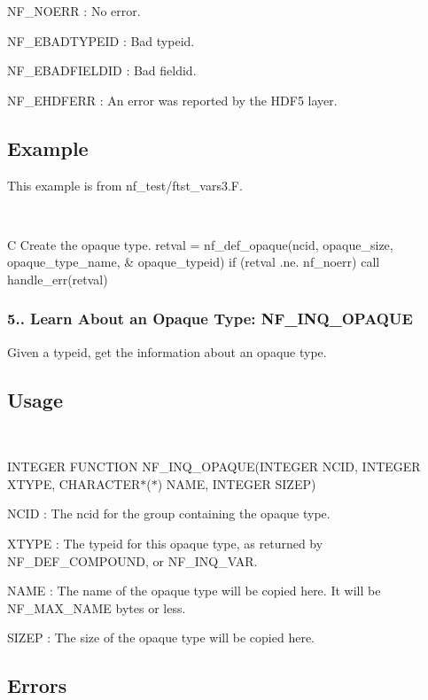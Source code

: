 {\ttfamily N\+F\+\_\+\+N\+O\+E\+RR} \+: No error.

{\ttfamily N\+F\+\_\+\+E\+B\+A\+D\+T\+Y\+P\+E\+ID} \+: Bad typeid.

{\ttfamily N\+F\+\_\+\+E\+B\+A\+D\+F\+I\+E\+L\+D\+ID} \+: Bad fieldid.

{\ttfamily N\+F\+\_\+\+E\+H\+D\+F\+E\+RR} \+: An error was reported by the H\+D\+F5 layer.

\subsection*{Example }

This example is from nf\+\_\+test/ftst\+\_\+vars3.\+F.

 

C Create the opaque type. retval = nf\+\_\+def\+\_\+opaque(ncid, opaque\+\_\+size, opaque\+\_\+type\+\_\+name, \& opaque\+\_\+typeid) if (retval .ne. nf\+\_\+noerr) call handle\+\_\+err(retval)

\subsubsection*{5.. Learn About an Opaque Type\+: N\+F\+\_\+\+I\+N\+Q\+\_\+\+O\+P\+A\+Q\+UE}

Given a typeid, get the information about an opaque type.

\subsection*{Usage }

 

I\+N\+T\+E\+G\+ER F\+U\+N\+C\+T\+I\+ON N\+F\+\_\+\+I\+N\+Q\+\_\+\+O\+P\+A\+Q\+UE(I\+N\+T\+E\+G\+ER N\+C\+ID, I\+N\+T\+E\+G\+ER X\+T\+Y\+PE, C\+H\+A\+R\+A\+C\+T\+E\+R$\ast$($\ast$) N\+A\+ME, I\+N\+T\+E\+G\+ER S\+I\+Z\+EP)

{\ttfamily N\+C\+ID} \+: The ncid for the group containing the opaque type.

{\ttfamily X\+T\+Y\+PE} \+: The typeid for this opaque type, as returned by N\+F\+\_\+\+D\+E\+F\+\_\+\+C\+O\+M\+P\+O\+U\+ND, or N\+F\+\_\+\+I\+N\+Q\+\_\+\+V\+AR.

{\ttfamily N\+A\+ME} \+: The name of the opaque type will be copied here. It will be N\+F\+\_\+\+M\+A\+X\+\_\+\+N\+A\+ME bytes or less.

{\ttfamily S\+I\+Z\+EP} \+: The size of the opaque type will be copied here.

\subsection*{Errors }

